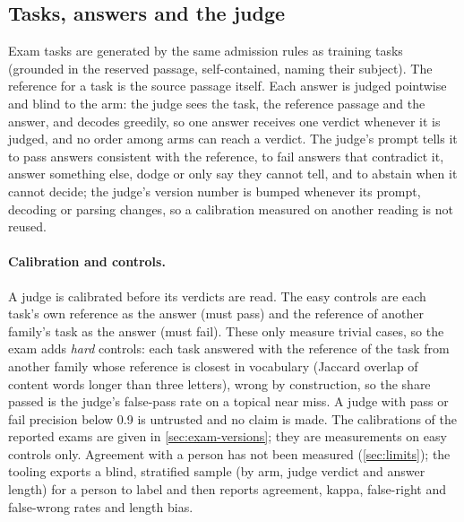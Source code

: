 \subsection{Tasks, answers and the judge}

Exam tasks are generated by the same admission rules as training tasks (grounded in the
reserved passage, self-contained, naming their subject). The reference for a task is the
source passage itself. Each answer is judged pointwise and blind to the arm: the judge
sees the task, the reference passage and the answer, and decodes greedily, so one answer
receives one verdict whenever it is judged, and no order among arms can reach a verdict.
The judge's prompt tells it to pass answers consistent with the reference, to fail answers that
contradict it, answer something else, dodge or only say they cannot tell, and to abstain
when it cannot decide; the judge's version number is bumped whenever its prompt, decoding or
parsing changes, so a calibration measured on another reading is not reused.

\paragraph{Calibration and controls.}
A judge is calibrated before its verdicts are read. The easy controls are each task's own
reference as the answer (must pass) and the reference of another family's task as the
answer (must fail). These only measure trivial cases, so the exam adds \emph{hard}
controls: each task answered with the reference of the task from another family whose reference
is closest in vocabulary (Jaccard overlap of content words longer than three letters),
wrong by construction, so the share passed is the judge's
false-pass rate on a topical near miss. A judge with pass or fail precision below 0.9 is
untrusted and no claim is made. The calibrations of the reported exams are given in
\cref{sec:exam-versions}; they are measurements on easy controls only. Agreement with a
person has not been measured (\cref{sec:limits}); the tooling exports a blind,
stratified sample (by arm, judge verdict and answer length) for a person to label and then
reports agreement, kappa, false-right and false-wrong rates and length bias.

